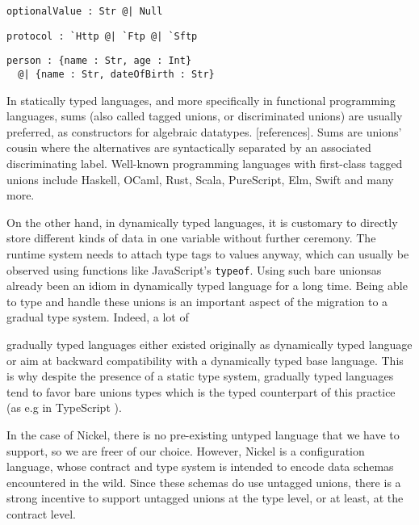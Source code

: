 \documentclass[sigplan,10pt,review,anonymous]{acmart}
\newcommand{\unsure}[2][1=]{}
\newcommand{\resolved}[2]{}
\begin{document}
\label{fig:union-nullable-ex}
\begin{lstlisting}[title={Nullable values}]
optionalValue : Str @| Null
\end{lstlisting}

\label{fig:union-enum-ex}
\begin{lstlisting}[title={Plain enumeration}]
protocol : `Http @| `Ftp @| `Sftp
\end{lstlisting}

\label{fig:union-alt-ex}
\begin{lstlisting}[title={Alternative representations}]
person : {name : Str, age : Int}
  @| {name : Str, dateOfBirth : Str}
\end{lstlisting}

In statically typed languages, and more specifically in functional programming
languages, sums (also called tagged unions, or discriminated unions) are usually
preferred, as constructors for algebraic datatypes. [references]. Sums are unions' cousin where the alternatives are
syntactically separated by an associated discriminating label. Well-known
programming languages with first-class tagged unions include Haskell, OCaml,
Rust, Scala, PureScript, Elm, Swift and many more.

On the other hand, in dynamically typed languages, it is customary to directly
store different kinds of data in one variable without further ceremony. The
runtime system needs to attach type tags to values anyway, which can usually be
observed using functions like JavaScript's \verb+typeof+. Using such bare
unions\resolved{If you can observe with typeof, then it's pretty much a tagged
union, though the tag is implicit} has already been an idiom in dynamically
typed language for a long time. Being able to type and handle these unions is an
important aspect of the migration to a gradual type system. Indeed, a lot of
\unsure{This is the first time discussing gradual type systems, maybe it should
be introduced earlier, in particular how they relate to contracts
(I think is mentioned on the appendix)}
gradually typed languages either existed originally as dynamically typed
language or aim at backward compatibility with a dynamically typed base
language. This is why despite the presence of a static type system, gradually
typed languages tend to favor bare unions types which is the typed counterpart
of this practice (as e.g in TypeScript \cite{TypeScriptUnions}).

In the case of Nickel, there is no pre-existing untyped language that we have to
support, so we are freer of our choice. However, Nickel is a configuration
language, whose contract and type system is intended to encode data schemas encountered in the wild. Since these schemas do use
untagged unions, there is a strong incentive to support untagged unions at the
type level, or at least, at the contract level.
\end{document}
